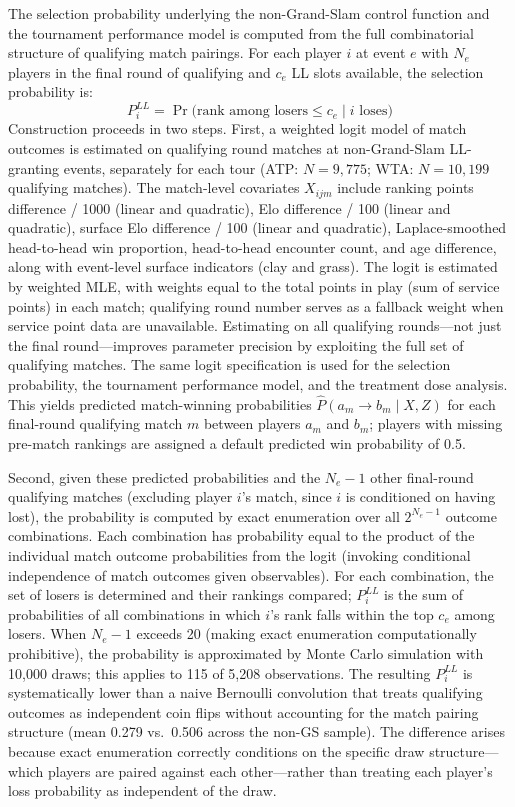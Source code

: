 The selection probability underlying the non-Grand-Slam control function and the tournament performance model is computed from the full combinatorial structure of qualifying match pairings. For each player $i$ at event $e$ with $N_e$ players in the final round of qualifying and $c_e$ LL slots available, the selection probability is:
\[
P_i^{LL} = \Pr\bigl(\text{rank among losers} \leq c_e \mid i \text{ loses}\bigr)
\]
Construction proceeds in two steps. First, a weighted logit model of match outcomes is estimated on qualifying round matches at non-Grand-Slam LL-granting events, separately for each tour (ATP: $N = 9{,}775$; WTA: $N = 10{,}199$ qualifying matches). The match-level covariates $X_{ijm}$ include ranking points difference / 1000 (linear and quadratic), Elo difference / 100 (linear and quadratic), surface Elo difference / 100 (linear and quadratic), Laplace-smoothed head-to-head win proportion, head-to-head encounter count, and age difference, along with event-level surface indicators (clay and grass). The logit is estimated by weighted MLE, with weights equal to the total points in play (sum of service points) in each match; qualifying round number serves as a fallback weight when service point data are unavailable. Estimating on all qualifying rounds---not just the final round---improves parameter precision by exploiting the full set of qualifying matches. The same logit specification is used for the selection probability, the tournament performance model, and the treatment dose analysis. This yields predicted match-winning probabilities $\hat{P}(a_m \to b_m \mid X, Z)$ for each final-round qualifying match $m$ between players $a_m$ and $b_m$; players with missing pre-match rankings are assigned a default predicted win probability of 0.5.

Second, given these predicted probabilities and the $N_e - 1$ other final-round qualifying matches (excluding player $i$'s match, since $i$ is conditioned on having lost), the probability is computed by exact enumeration over all $2^{N_e - 1}$ outcome combinations. Each combination has probability equal to the product of the individual match outcome probabilities from the logit (invoking conditional independence of match outcomes given observables). For each combination, the set of losers is determined and their rankings compared; $P_i^{LL}$ is the sum of probabilities of all combinations in which $i$'s rank falls within the top $c_e$ among losers. When $N_e - 1$ exceeds 20 (making exact enumeration computationally prohibitive), the probability is approximated by Monte Carlo simulation with 10,000 draws; this applies to 115 of 5,208 observations. The resulting $P_i^{LL}$ is systematically lower than a naive Bernoulli convolution that treats qualifying outcomes as independent coin flips without accounting for the match pairing structure (mean 0.279 vs.\ 0.506 across the non-GS sample). The difference arises because exact enumeration correctly conditions on the specific draw structure---which players are paired against each other---rather than treating each player's loss probability as independent of the draw.

